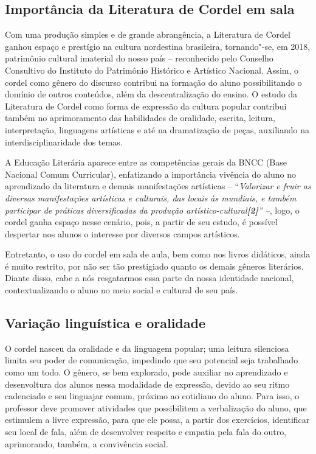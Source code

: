 \documentclass[12pt]{extarticle}
\begin{document}
{\subsection{Importância da Literatura de Cordel em sala}

Com uma produção simples e de grande abrangência, a Literatura de Cordel
ganhou espaço e prestígio na cultura nordestina brasileira, tornando"-se,
em 2018, patrimônio cultural imaterial do nosso país -- reconhecido pelo
Conselho Consultivo do Instituto do Patrimônio Histórico e Artístico
Nacional. Assim, o cordel como gênero do discurso contribui na formação
do aluno possibilitando o domínio de outros conteúdos, além da
descentralização do ensino. O estudo da Literatura de Cordel como forma
de expressão da cultura popular contribui também no aprimoramento das
habilidades de oralidade, escrita, leitura, interpretação, linguagens
artísticas e até na dramatização de peças, auxiliando na
interdisciplinaridade dos temas.

A Educação Literária aparece entre as competências gerais da BNCC (Base
Nacional Comum Curricular), enfatizando a importância vivência do aluno
no aprendizado da literatura e demais manifestações artísticas --
``\emph{Valorizar e fruir as diversas manifestações artísticas e
culturais, das locais às mundiais, e também participar de práticas
diversificadas da produção artístico-cultural\textbf{{[}2{]}}'' --},
logo, o cordel ganha espaço nesse cenário, pois, a partir de seu estudo,
é possível despertar nos alunos o interesse por diversos campos
artísticos.

Entretanto, o uso do cordel em sala de aula, bem como nos livros
didáticos, ainda é muito restrito, por não ser tão prestigiado quanto os
demais gêneros literários. Diante disso, cabe a nós resgatarmos essa
parte da nossa identidade nacional, contextualizando o aluno no meio
social e cultural de seu país.


\subsection{Variação linguística e oralidade}

O cordel nasceu da oralidade e da linguagem popular; uma leitura
silenciosa limita seu poder de comunicação, impedindo que seu potencial
seja trabalhado como um todo. O gênero, se bem explorado, pode auxiliar
no aprendizado e desenvoltura dos alunos nessa modalidade de expressão,
devido ao seu ritmo cadenciado e seu linguajar comum, próximo ao
cotidiano do aluno. Para isso, o professor deve promover atividades que
possibilitem a verbalização do aluno, que estimulem a livre expressão,
para que ele possa, a partir dos exercícios, identificar seu local de
fala, além de desenvolver respeito e empatia pela fala do outro,
aprimorando, também, a convivência social.

}
\end{document}
